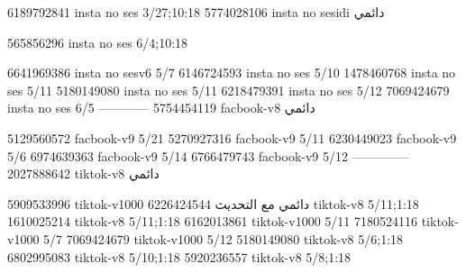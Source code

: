 
6189792841 insta no ses
3/27;10:18
5774028106 insta no sesidi
دائمي


565856296 insta no ses
6/4;10:18

6641969386 insta no sesv6
5/7
6146724593 insta no ses
5/10
1478460768 insta no ses
5/11
5180149080 insta no ses
5/11
6218479391 insta no ses
5/12
7069424679 insta no ses
6/5
------------
5754454119 facbook-v8
دائمي

5129560572 facbook-v9
5/21
5270927316 facbook-v9
5/11
6230449023 facbook-v9
5/6
6974639363 facbook-v9
5/14
6766479743 facbook-v9
5/12
--------------
2027888642 tiktok-v8
دائمي

5909533996 tiktok-v1000
دائمي مع التحديث
6226424544 tiktok-v8
5/11;1:18
1610025214 tiktok-v8
5/11;1:18
6162013861 tiktok-v1000
5/11
7180524116 tiktok-v1000
5/7
7069424679 tiktok-v1000
5/12
5180149080 tiktok-v8
5/6;1:18
6802995083 tiktok-v8
5/10;1:18
5920236557 tiktok-v8
5/8;1:18
